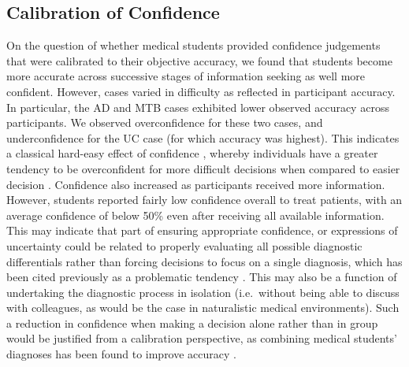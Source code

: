 \documentclass[a4paper, nobind]{templates/ociamthesis}
\begin{document}
\subsection{Calibration of Confidence}\label{calibration-of-confidence}

On the question of whether medical students provided confidence judgements that were calibrated to their objective accuracy, we found that students become more accurate across successive stages of information seeking as well more confident. However, cases varied in difficulty as reflected in participant accuracy. In particular, the AD and MTB cases exhibited lower observed accuracy across participants. We observed overconfidence for these two cases, and underconfidence for the UC case (for which accuracy was highest). This indicates a classical hard-easy effect of confidence \autocite{lichtenstein_calibration_1977}, whereby individuals have a greater tendency to be overconfident for more difficult decisions when compared to easier decision \autocite{merkle_disutility_2009}. Confidence also increased as participants received more information. However, students reported fairly low confidence overall to treat patients, with an average confidence of below 50\% even after receiving all available information. This may indicate that part of ensuring appropriate confidence, or expressions of uncertainty could be related to properly evaluating all possible diagnostic differentials rather than forcing decisions to focus on a single diagnosis, which has been cited previously as a problematic tendency \autocite{redelmeier_fallacy_2023}. This may also be a function of undertaking the diagnostic process in isolation (i.e.~without being able to discuss with colleagues, as would be the case in naturalistic medical environments). Such a reduction in confidence when making a decision alone rather than in group would be justified from a calibration perspective, as combining medical students' diagnoses has been found to improve accuracy \autocite{kammer_potential_2017}.\\
\end{document}
